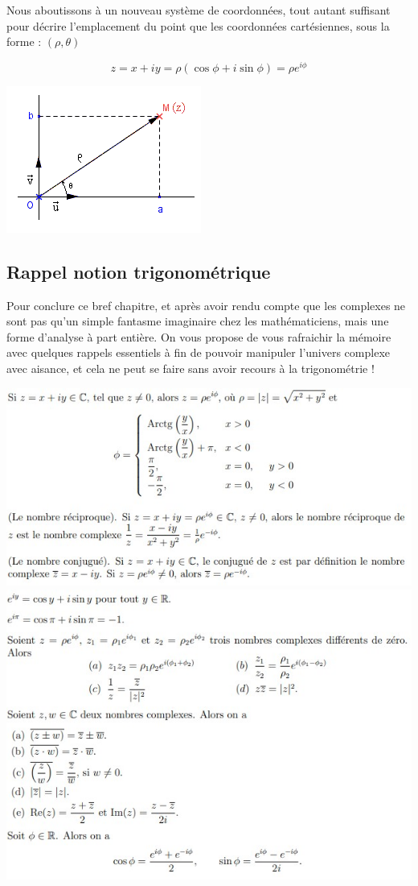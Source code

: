 Nous aboutissons à un nouveau système de coordonnées, tout autant suffisant pour décrire l'emplacement du point que les coordonnées cartésiennes, sous la forme : $(\rho, \theta)$

$$z = x + iy =  \rho(\cos \phi + i\sin \phi) = \rho e^{i\phi}$$

\includegraphics[scale=.5]{assets/imgs/complexe2.png}

\subsection{Rappel notion trigonométrique}

Pour conclure ce bref chapitre, et après avoir rendu compte que les complexes ne sont pas qu'un simple fantasme imaginaire chez les mathématiciens, mais une forme d'analyse à part entière. On vous propose de vous rafraichir la mémoire avec quelques rappels essentiels à fin de pouvoir manipuler l'univers complexe avec aisance, et cela ne peut se faire sans avoir recours à la trigonométrie !

\includegraphics[scale=.7]{assets/imgs/complexe3.jpg}
\newline
\includegraphics[scale=.7]{assets/imgs/complexe4.jpg}

